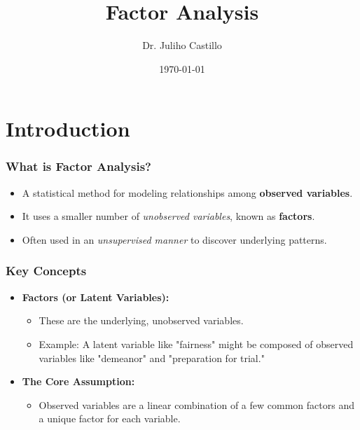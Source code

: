 \documentclass[aspectratio=169]{beamer}
\title{Factor Analysis}
\author{Dr. Juliho Castillo}
\institute{Tecnológico de Monterrey}
\date{\today}
\begin{document}
\begin{frame}
    \titlepage
\end{frame}

\begin{frame}
    \tableofcontents
\end{frame}


\section{Introduction}

\begin{frame}[fragile]
\frametitle{What is Factor Analysis?}
\begin{itemize}
    \item A statistical method for modeling relationships among \textbf{observed variables}. \pause
    \item It uses a smaller number of \textit{unobserved variables}, known as \textbf{factors}. \pause
    \item Often used in an \textit{unsupervised manner} to discover underlying patterns.
\end{itemize}
\end{frame}

\begin{frame}[fragile]
\frametitle{Key Concepts}
\begin{itemize}
    \item \textbf{Factors (or Latent Variables):} \pause
    \begin{itemize}
        \item These are the underlying, unobserved variables. \pause
        \item Example: A latent variable like "fairness" might be composed of observed variables like "demeanor" and "preparation for trial."
    \end{itemize}
    \item \textbf{The Core Assumption:} \pause
    \begin{itemize}
        \item Observed variables are a linear combination of a few common factors and a unique factor for each variable.
    \end{itemize}
\end{itemize}
\end{frame}
\end{document}

